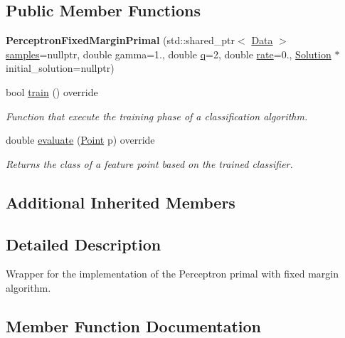 \subsection*{Public Member Functions}
\begin{DoxyCompactItemize}
\item 
\mbox{\label{class_perceptron_fixed_margin_primal_a0a0e3e5d302d640f7a66701e7166304d}} 
{\bfseries Perceptron\+Fixed\+Margin\+Primal} (std\+::shared\+\_\+ptr$<$ \hyperlink{class_data}{Data} $>$ \hyperlink{class_classifier_aad6a4fcea8f44339d7a6302f530852ca}{samples}=nullptr, double gamma=1., double \hyperlink{class_primal_classifier_a746ad2ff93fb77d82ae389f90dbdc89e}{q}=2, double \hyperlink{class_classifier_af9867e5919742de1303dd971a9a1c19a}{rate}=0., \hyperlink{class_solution}{Solution} $\ast$initial\+\_\+solution=nullptr)
\item 
bool \hyperlink{class_perceptron_fixed_margin_primal_ad013cf0293dd8cda3ac751216b5a7f89}{train} () override
\begin{DoxyCompactList}\small\item\em Function that execute the training phase of a classification algorithm. \end{DoxyCompactList}\item 
double \hyperlink{class_perceptron_fixed_margin_primal_aa24b3bd358a438797c62fa13ef7b8872}{evaluate} (\hyperlink{class_point}{Point} p) override
\begin{DoxyCompactList}\small\item\em Returns the class of a feature point based on the trained classifier. \end{DoxyCompactList}\end{DoxyCompactItemize}
\subsection*{Additional Inherited Members}


\subsection{Detailed Description}
Wrapper for the implementation of the Perceptron primal with fixed margin algorithm. 

\subsection{Member Function Documentation}
\mbox{\label{class_perceptron_fixed_margin_primal_aa24b3bd358a438797c62fa13ef7b8872}} 
